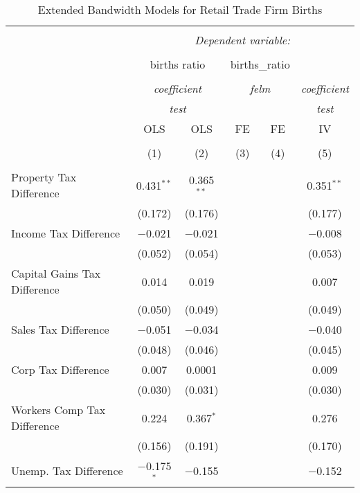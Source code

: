 
\begin{table}[!htbp] \centering 
  \caption{Extended Bandwidth Models for  Retail Trade Firm Births} 
  \label{} 
\begin{tabular}{@{\extracolsep{5pt}}lccccc} 
\\[-1.8ex]\hline 
\hline \\[-1.8ex] 
 & \multicolumn{5}{c}{\textit{Dependent variable:}} \\ 
\cline{2-6} 
\\[-1.8ex] & \multicolumn{2}{c}{births ratio} & \multicolumn{2}{c}{births\_ratio} &   \\ 
\\[-1.8ex] & \multicolumn{2}{c}{\textit{coefficient}} & \multicolumn{2}{c}{\textit{felm}} & \textit{coefficient} \\ 
 & \multicolumn{2}{c}{\textit{test}} & \multicolumn{2}{c}{\textit{}} & \textit{test} \\ 
 & OLS & OLS & FE & FE & IV \\ 
\\[-1.8ex] & (1) & (2) & (3) & (4) & (5)\\ 
\hline \\[-1.8ex] 
 Property Tax Difference & 0.431$^{**}$ & 0.365$^{**}$ &  &  & 0.351$^{**}$ \\ 
  & (0.172) & (0.176) &  &  & (0.177) \\ 
  Income Tax Difference & $-$0.021 & $-$0.021 &  &  & $-$0.008 \\ 
  & (0.052) & (0.054) &  &  & (0.053) \\ 
  Capital Gains Tax Difference & 0.014 & 0.019 &  &  & 0.007 \\ 
  & (0.050) & (0.049) &  &  & (0.049) \\ 
  Sales Tax Difference & $-$0.051 & $-$0.034 &  &  & $-$0.040 \\ 
  & (0.048) & (0.046) &  &  & (0.045) \\ 
  Corp Tax Difference & 0.007 & 0.0001 &  &  & 0.009 \\ 
  & (0.030) & (0.031) &  &  & (0.030) \\ 
  Workers Comp Tax Difference & 0.224 & 0.367$^{*}$ &  &  & 0.276 \\ 
  & (0.156) & (0.191) &  &  & (0.170) \\ 
  Unemp. Tax Difference & $-$0.175$^{*}$ & $-$0.155 &  &  & $-$0.152 \\ 

\end{tabular}
\end{table}

